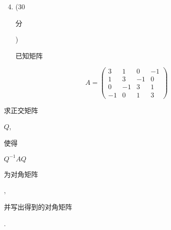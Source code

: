 \documentclass[10pt]{article}
\begin{document}
\begin{enumerate}
  \setcounter{enumi}{3}
  \item (30 \begin{CJK}{UTF8}{mj}分\end{CJK}) \begin{CJK}{UTF8}{mj}已知矩阵\end{CJK}
\end{enumerate}
$$
A=\left(\begin{array}{cccc}
3 & 1 & 0 & -1 \\
1 & 3 & -1 & 0 \\
0 & -1 & 3 & 1 \\
-1 & 0 & 1 & 3
\end{array}\right)
$$
\begin{CJK}{UTF8}{mj}求正交矩阵\end{CJK} $Q$, \begin{CJK}{UTF8}{mj}使得\end{CJK} $Q^{-1} A Q$ \begin{CJK}{UTF8}{mj}为对角矩阵\end{CJK}, \begin{CJK}{UTF8}{mj}并写出得到的对角矩阵\end{CJK}.
\end{document}
